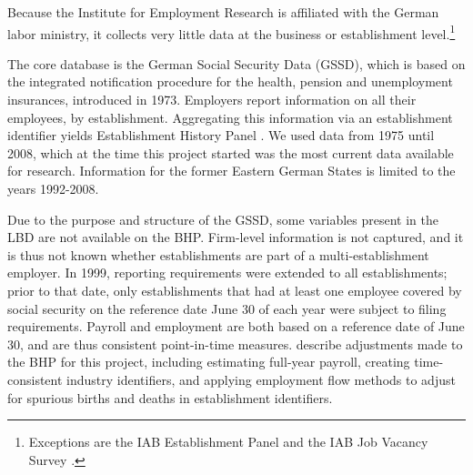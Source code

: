 Because the Institute for Employment Research is affiliated with the German labor ministry, it collects very little data  at the business or establishment level.\footnote{Exceptions are the IAB Establishment Panel \citep{IABEstabPanel} and the IAB Job Vacancy Survey \citep{JVS}.}

The core database is the German Social Security Data  (GSSD), which is based on the integrated notification procedure for the health, pension and unemployment insurances,   introduced in  1973. Employers report information on all their employees, by establishment. Aggregating this information via an establishment identifier yields Establishment History Panel \citep[German abbreviation: BHP]{BHP}. We used data from  1975 until 2008, which at the time this project started was the most current data available for research. Information for the former Eastern German States is limited to the years 1992-2008. 

Due to the purpose and structure of the GSSD, some variables present in the \ac{LBD} are not available on the  \ac{BHP}. Firm-level information is not captured, and it is thus not known whether establishments are part of a multi-establishment employer. In 1999, reporting requirements were extended to all establishments; prior to that date, only establishments that  had at least one employee covered by social security on the reference date June 30 of each year were subject to filing requirements. Payroll and employment are both based on a reference date of June 30, and are thus consistent point-in-time measures. 
\citet{SJIAOS-2014b} describe   adjustments made to the \ac{BHP} for this project, including estimating full-year payroll, creating time-consistent industry identifiers, and applying employment flow methods \citep{RePEc:iab:iabfme:201006_en} to adjust for spurious births and deaths in establishment identifiers. 




